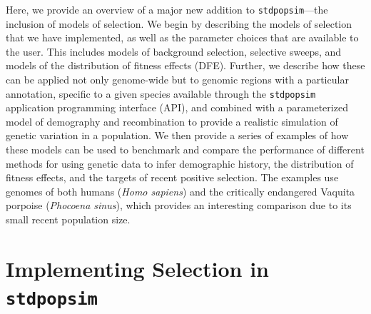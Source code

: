 \documentclass[hidelinks]{article}
\newcommand{\stdpopsim}{\texttt{stdpopsim}\xspace}
\begin{document}
    Here, we provide an overview of a major new addition
    to \stdpopsim---the inclusion of models of selection.
    We begin by describing the models of selection that we have implemented,
    as well as the parameter choices that are available to the user.
    This includes models of background selection, selective sweeps, and
    models of the distribution of fitness effects (DFE).
    Further, we describe how these can be applied not only genome-wide but to
    genomic regions with a particular annotation, specific to a given species available
    through the \stdpopsim application programming interface (API), and combined with a parameterized model of
    demography and recombination to provide a realistic simulation of
    genetic variation in a population.
    We then provide a series of examples of how these models can be used
    to benchmark and compare the performance of different methods for
    using genetic data to infer demographic history, the distribution of fitness effects,
    and the targets of recent positive selection.
    The examples use genomes of both humans (\textit{Homo sapiens})
    and the critically endangered Vaquita porpoise (\textit{Phocoena sinus}),
    which provides an interesting comparison due to its small recent population size. 

\section*{Implementing Selection in \stdpopsim}
    \label{selection}
\end{document}
